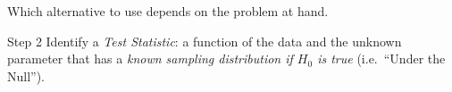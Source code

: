 \documentclass[handout]{beamer}
\begin{document}










\begin{frame}
\begin{center}
\huge Which alternative to use depends on the problem at hand.
\end{center}
\end{frame}


\begin{frame}
\begin{alertblock}{Step 2}
Identify a \emph{Test Statistic}: a function of the data and the unknown parameter that has a \emph{known sampling distribution if $H_0$ is true} (i.e.\ ``Under the Null'').
\end{alertblock}
\end{frame}
\end{document}
